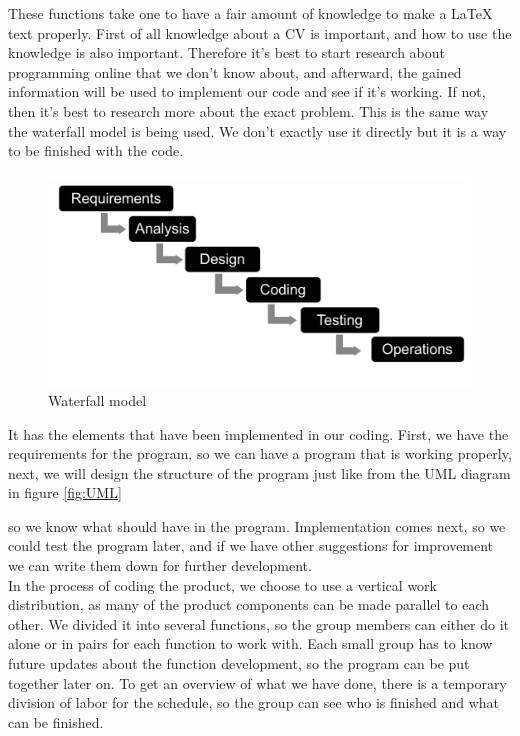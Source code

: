 These functions take one to have a fair amount of knowledge to make a LaTeX text properly.
First of all knowledge about a CV is important, and how to use the knowledge is also important.
Therefore it's best to start research about programming online that we don't know about, 
and afterward, the gained information will be used to implement our code and see if it's working. 
If not, then it's best to research more about the exact problem.
This is the same way the waterfall model is being used.
We don't exactly use it directly but it is a way to be finished with the code.
\begin{figure}[H]
  \centering
  \includegraphics[scale = 0.2]{figures/vandfald}
  \caption{Waterfall model \cite{Waterfall_model}}
\end{figure}

It has the elements that have been implemented in our coding. First, we have the requirements for the program, 
so we can have a program that is working properly, 
next, we will design the structure of the program just like from the UML diagram in figure \vref{fig:UML}
 
so we know what should have in the program. Implementation comes next, so we could test the program later, 
and if we have other suggestions for improvement we can write them down for further development.\\

In the process of coding the product, we choose to use a vertical work distribution, as many of the product
components can be made parallel to each other. We divided it into several functions, 
so the group members can either do it alone or in pairs for each function to work with.
Each small group has to know future updates about the function development, so the program can be put together later on.
To get an overview of what we have done, there is a temporary division of labor for the schedule, 
so the group can see who is finished and what can be finished. \\

